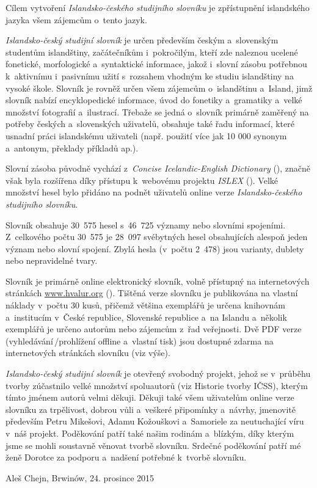 Cílem vytvoření\textit{ Islandsko-českého studijního slovníku} je zpřístupnění islandského jazyka všem zájemcům o~tento jazyk. 

\textit{Islandsko-český studijní slovník} je určen především českým a~slovenským studentům islandštiny, začátečníkům i~pokročilým, kteří zde naleznou ucelené fonetické, morfologické a~syntaktické informace, jakož
i~slovní zásobu potřebnou k~aktivnímu i~pasivnímu užití s~rozsahem vhodným ke studiu islandštiny na vysoké škole.
Slovník je rovněž určen všem zájemcům o~islandštinu a~Island, jimž slovník nabízí encyklopedické informace, úvod do fonetiky a~gramatiky a~velké množství fotografií a~ilustrací. 
Třebaže se jedná o~slovník primárně zaměřený na potřeby českých a~slovenských uživatelů, obsahuje také řadu informací, které usnadní práci islandskému uživateli (např. použití více jak 10 000 synonym a~antonym, překlady příkladů ap.).

Slovní zásoba původně vychází z~\textit{Concise Icelandic-English Dictionary} (\cite {ic_en}), značně však byla rozšířena díky přístupu k~webovému projektu \textit{ISLEX} (\cite {int1}). Velké množství hesel bylo
přidáno na podnět uživatelů online verze \textit{Islandsko-českého studijního slovníku}.

Slovník obsahuje 30~575 hesel s~46~725 významy nebo slovními spojeními. Z~celkového počtu 30~575 je 28~097 svébytných hesel obsahujících alespoň jeden význam nebo slovní spojení. 
Zbylá hesla (v~počtu 2~478) jsou varianty, dublety nebo nepravidelné tvary.

Slovník je primárně online elektronický slovník, volně přístupný na internetových stránkách \url{www.hvalur.org}  (\cite {int14}). 
Tištěná verze slovníku je publikována na vlastní náklady v~počtu 30 kusů, přičemž většina exemplářů je určena knihovnám a~institucím v~České republice, Slovenské republice a~na Islandu
a~několik exemplářů je určeno autorům nebo zájemcům z~řad veřejnosti. Dvě PDF verze (vyhledávání\,/\addthin prohlížení offline a~vlastní tisk) jsou dostupné zdarma na internetových stránkách slovníku (viz výše).

\textit{Islandsko-český studijní slovník} je otevřený svobodný projekt, jehož se v~průběhu tvorby zúčastnilo velké množství spoluautorů (viz Historie tvorby IČSS), kterým tímto jménem autorů velmi děkuji.
Děkuji také všem uživatelům online verze slovníku za trpělivost, dobrou vůli a~veškeré připomínky a~návrhy, jmenovitě především Petru Mikešovi, Adamu Kožouškovi a~Samoriele za neutuchající víru v~náš projekt.
Poděkování patří také našim rodinám a~blízkým, díky kterým jsme se mohli soustavně věnovat tvorbě slovníku.
Srdečné poděkování patří mé ženě Dorotce za podporu a~nadšení potřebné k~tvorbě slovníku.

\blspace[5]

{\centering Aleš Chejn, Brwinów, 24. prosince 2015\par}
